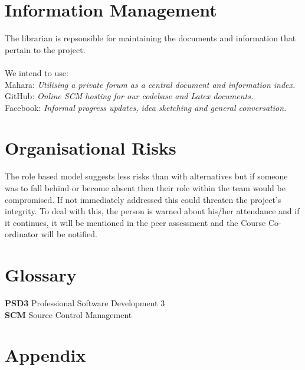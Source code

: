 \documentclass{l3deliverable}
\begin{document}
{\section{Information Management}

The librarian is repsonsible for maintaining the documents and information that pertain to the project.\\
\\
We intend to use:\\

Mahara: \textit{Utilising a private forum as a central document and information index.}\\
GitHub: \textit{Online SCM hosting for our codebase and Latex documents.}\\
Facebook: \textit{Informal progress updates, idea sketching and general conversation.}\\



\section{Organisational Risks}

The role based model suggests less risks than with alternatives but if someone was to fall behind or
become absent then their role within the team would be compromised. If not immediately addressed
this could threaten the project's integrity. To deal with this, the person is warned about his/her attendance and if it continues, it will be mentioned in the peer assessment and the Course Co-ordinator will be notified.


\appendix

\section{Glossary}

\textbf{PSD3} Professional Software Development 3\\
\textbf{SCM} Source Control Management\\

\section{Appendix}

}
\end{document}
